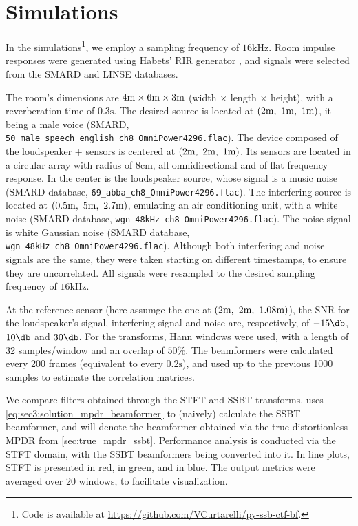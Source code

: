 
\section{Simulations}
\label{sec:results}

In the simulations\footnote{Code is available at \url{https://github.com/VCurtarelli/py-ssb-ctf-bf}.}, we employ a sampling frequency of $16\si{\kilo\hertz}$. Room impulse responses were generated using Habets' RIR generator \cite{habets_rir-generator}, and signals were selected from the SMARD \cite{smard_database} and LINSE \cite{linse_database} databases.

The room's dimensions are $4\si{\meter} \times 6\si{\meter} \times 3\si{\meter}$ (width $\times$ length $\times$ height), with a reverberation time of $0.3\si{\second}$. The desired source is located at $(2\si{\meter},~1\si{\meter},~1\si{\meter})$, it being a male voice (SMARD, \texttt{50\_male\_speech\_english\_ch8\_OmniPower4296.flac}).
%
The device composed of the loudspeaker + sensors is centered at $(2\si{\meter},~2\si{\meter},~1\si{\meter})$. Its sensors are located in a circular array with radius of $8\si{\centi\meter}$, all omnidirectional and of flat frequency response. In the center is the loudspeaker source, whose signal is a music noise (SMARD database, \texttt{69\_abba\_ch8\_OmniPower4296.flac}). The interfering source is located at $(0.5\si{\meter},~5\si{\meter},~2.7\si{\meter})$, emulating an air conditioning unit, with a white noise (SMARD database, \texttt{wgn\_48kHz\_ch8\_OmniPower4296.flac}). The noise signal is white Gaussian noise (SMARD database, \texttt{wgn\_48kHz\_ch8\_OmniPower4296.flac}). Although both interfering and noise signals are the same, they were taken starting on different timestamps, to ensure they are uncorrelated. All signals were resampled to the desired sampling frequency of $16\si{\kilo\hertz}$.

At the reference sensor (here assumge the one at $(2\si{\meter},~2\si{\meter},~1.08\si{\meter})$), the SNR for the loudspeaker's signal, interfering signal and noise are, respectively, of $-15\dB$, $10\dB$ and $30\dB$. For the transforms, Hann windows were used, with a length of 32 samples/window and an overlap of $50\%$. The beamformers were calculated every 200 frames (equivalent to every $0.2\si{\second}$), and used up to the previous 1000 samples to estimate the correlation matrices.

We compare filters obtained through the STFT and SSBT transforms. \nssbt{} uses \cref{eq:sec3:solution_mpdr_beamformer} to (naively) calculate the SSBT beamformer, and \nssbt{} will denote the beamformer obtained via the true-distortionless MPDR from \cref{sec:true_mpdr_ssbt}. Performance analysis is conducted via the STFT domain, with the SSBT beamformers being converted into it. In line plots, STFT is presented in red, \nssbt{} in green, and \nssbt{} in blue. The output metrics were averaged over 20 windows, to facilitate visualization.

